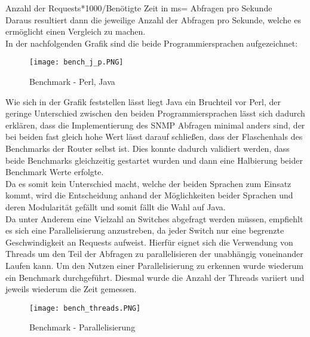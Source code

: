 Anzahl der Requests*1000/Benötigte Zeit in ms= Abfragen pro Sekunde\\

Daraus resultiert dann die jeweilige Anzahl der Abfragen pro Sekunde, welche es ermöglicht einen Vergleich zu machen.\\

In der nachfolgenden Grafik sind die beide Programmiersprachen aufgezeichnet:\\

\begin{figure}[H]
\centering
\texttt{[image: bench\_j\_p.PNG]}
\caption{Benchmark - Perl, Java}
\label{fig:benchperljava}
\end{figure}

Wie sich in der Grafik feststellen lässt liegt Java ein Bruchteil vor Perl, der geringe Unterschied zwischen den beiden Programmiersprachen lässt sich dadurch erklären, dass die Implementierung des SNMP Abfragen minimal anders sind, der bei beiden fast gleich hohe Wert lässt darauf schließen, dass der Flaschenhals des Benchmarks der Router selbst ist. Dies konnte dadurch validiert werden, dass beide Benchmarks  gleichzeitig gestartet wurden und dann eine Halbierung beider Benchmark Werte erfolgte.\\
Da es somit kein Unterschied macht, welche der beiden Sprachen zum Einsatz kommt, wird die Entscheidung anhand der Möglichkeiten beider Sprachen und deren Modularität gefällt und somit fällt die Wahl auf Java.\\

Da unter Anderem eine Vielzahl an Switches abgefragt werden müssen, empfiehlt es sich eine Parallelisierung anzustreben, da jeder Switch nur eine begrenzte Geschwindigkeit an Requests aufweist. Hierfür eignet sich die Verwendung von Threads um den Teil der Abfragen zu parallelisieren der unabhängig voneinander Laufen kann. Um den Nutzen einer Parallelisierung zu erkennen wurde wiederum ein Benchmark durchgeführt. Diesmal wurde die Anzahl der Threads variiert und jeweils wiederum die Zeit gemessen.\\

\begin{figure}[H]
\centering
\texttt{[image: bench\_threads.PNG]}
\caption{Benchmark - Parallelisierung}
\label{fig:benchparallel}
\end{figure}

